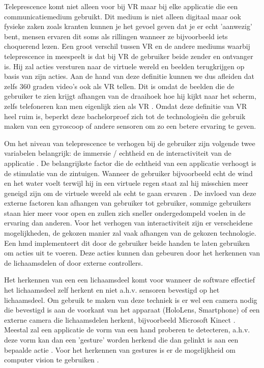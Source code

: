 Teleprescence komt niet alleen voor bij VR maar bij elke applicatie die een communicatiemedium gebruikt. Dit medium is niet alleen digitaal maar ook fysieke zaken zoals kranten kunnen je het gevoel geven dat je er echt 'aanwezig' bent, mensen ervaren dit soms als rillingen wanneer ze bijvoorbeeld iets choquerend lezen. 
Een groot verschil tussen VR en de andere mediums waarbij teleprescence in meespeelt is dat bij VR de gebruiker beide zender en ontvanger is. Hij zal acties versturen naar de virtuele wereld en beelden terugkrijgen op basis van zijn acties.
Aan de hand van deze definitie kunnen we dus afleiden dat zelfs 360 graden video's ook als VR tellen. Dit is omdat de beelden die de gebruiker te zien krijgt afhangen van de draaihoek hoe hij kijkt naar het scherm, zelfs telefoneren kan men eigenlijk zien als VR \autocite{Steuer1992}.
Omdat deze definitie van VR heel ruim is, beperkt deze bachelorproef zich tot de technologieën die gebruik maken van een gyroscoop of andere sensoren om zo een betere ervaring te geven.

Om het niveau van teleprescence te verhogen bij de gebruiker zijn volgende twee variabelen belangrijk: de immersie / echtheid en de interactiviteit van de applicatie \autocite{Steuer1992}.
De belangrijkste factor die de echtheid van een applicatie verhoogt is de stimulatie van de zintuigen. Wanneer de gebruiker bijvoorbeeld echt de wind en het water voelt terwijl hij in een virtuele regen staat zal hij misschien meer geneigd zijn om de virtuele wereld als echt te gaan ervaren \autocite{Steuer1992}. De invloed van deze externe factoren kan afhangen van gebruiker tot gebruiker, sommige gebruikers staan hier meer voor open en zullen zich sneller ondergedompeld voelen in de ervaring dan anderen.
Voor het verhogen van interactiviteit zijn er verscheidene mogelijkheden, de gekozen manier zal vaak afhangen van de gekozen technologie. Een \acrfull{hmd} implementeert dit door de gebruiker beide handen te laten gebruiken om acties uit te voeren. Deze acties kunnen dan gebeuren door het herkennen van de lichaamsdelen of door externe controllers.

Het herkennen van een een lichaamsdeel komt voor wanneer de software effectief het lichaamsdeel zelf herkent en niet a.h.v. sensoren bevestigd op het lichaamsdeel. Om gebruik te maken van deze techniek is er wel een camera nodig die bevestigd is aan de voorkant van het apparaat (HoloLens, Smartphone) of een externe camera die lichaamsdelen herkent, bijvoorbeeld Microsoft Kinect \autocite{Ren2013}.
Meestal zal een applicatie de vorm van een hand proberen te detecteren, a.h.v. deze vorm kan dan een 'gesture' worden herkend die dan gelinkt is aan een bepaalde actie \autocite{Piumsomboon2013}. 
Voor het herkennen van gestures is er de mogelijkheid om computer vision te gebruiken \autocite{Ji2013}.


